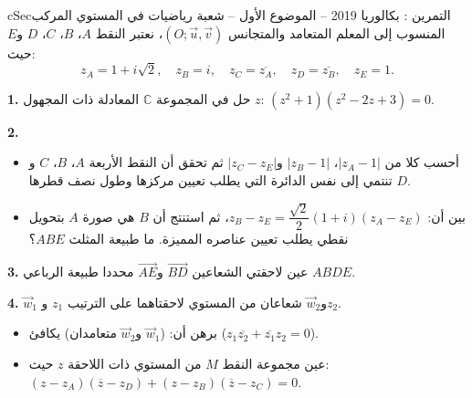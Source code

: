 \documentclass[12pt,a4paper]{article}
\newenvironment{BOX}[2]{\begin{otherlanguage}{english}\begin{arbox}{#1}{#2}}{\end{arbox}\end{otherlanguage}}
\newcounter{exo}
\newenvironment{tamrin}[1]{\stepcounter{exo}\begin{BOX}{cSec}{التمرين \theexo: #1}}{\end{BOX}}
\newenvironment{sq}{\begin{itemize}[leftmargin=2.4em,itemsep=3pt]}{\end{itemize}}
\newcommand{\qa}{\item[(أ)]}\newcommand{\qb}{\item[(ب)]}\newcommand{\qc}{\item[(جـ)]}\newcommand{\qd}{\item[(د)]}\newcommand{\qe}{\item[(هـ)]}
\newcommand{\QQ}[1]{\par\smallskip\textbf{#1.} }
\begin{document}
\begin{tamrin}{بكالوريا 2019 -- الموضوع الأول -- شعبة رياضيات}
في المستوي المركب المنسوب إلى المعلم المتعامد والمتجانس $\left(O;\vec u,\vec v\right)$، نعتبر النقط $A$، $B$، $C$، $D$ و$E$ حيث:
\[z_A=1+i\sqrt2,\quad z_B=i,\quad z_C=\overline{z_A},\quad z_D=\overline{z_B},\quad z_E=1.\]
\QQ{1} حل في المجموعة $\mathbb{C}$ المعادلة ذات المجهول $z$: $\left(z^2+1\right)\left(z^2-2z+3\right)=0$.

\QQ{2}
\begin{sq}
\qa أحسب كلا من $\left|z_A-1\right|$، $\left|z_B-1\right|$ و$\left|z_C-z_E\right|$ ثم تحقق أن النقط الأربعة $A$، $B$، $C$ و$D$ تنتمي إلى نفس الدائرة التي يطلب تعيين مركزها وطول نصف قطرها.
\qb بين أن: $z_B-z_E=\dfrac{\sqrt2}{2}(1+i)\left(z_A-z_E\right)$، ثم استنتج أن $B$ هي صورة $A$ بتحويل نقطي يطلب تعيين عناصره المميزة. ما طبيعة المثلث $ABE$؟
\end{sq}
\QQ{3} عين لاحقتي الشعاعين $\overrightarrow{BD}$ و$\overrightarrow{AE}$ محددا طبيعة الرباعي $ABDE$.

\QQ{4} $\vec w_1$ و$\vec w_2$ شعاعان من المستوي لاحقتاهما على الترتيب $z_1$ و$z_2$.
\begin{sq}
\qa برهن أن: ($\vec w_1$ و$\vec w_2$ متعامدان) يكافئ ($z_1\overline{z_2}+\overline{z_1}z_2=0$).
\qb عين مجموعة النقط $M$ من المستوي ذات اللاحقة $z$ حيث: $\left(z-z_A\right)\left(\overline{z}-z_D\right)+\left(z-z_B\right)\left(\overline{z}-z_C\right)=0$.
\end{sq}
\end{tamrin}
\end{document}
